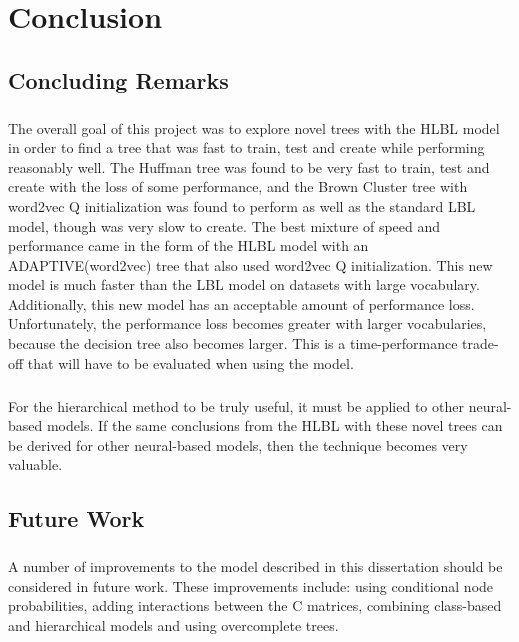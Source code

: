 
\chapter{Conclusion}

\section{Concluding Remarks}
\paragraph{}
The overall goal of this project was to explore novel trees with the HLBL model in order to find a tree that was fast to train, test and create while performing reasonably well. The Huffman tree was found to be very fast to train, test and create with the loss of some performance, and the Brown Cluster tree with word2vec Q initialization was found to perform as well as the standard LBL model, though was very slow to create. The best mixture of speed and performance came in the form of the HLBL model with an ADAPTIVE(word2vec) tree that also used word2vec Q initialization. This new model is much faster than the LBL model on datasets with large vocabulary. Additionally, this new model has an acceptable amount of performance loss. Unfortunately, the performance loss becomes greater with larger vocabularies, because the decision tree also  becomes larger. This is a time-performance trade-off that will have to be evaluated when using the model.
\paragraph{}
For the hierarchical method to be truly useful, it must be applied to other neural-based models. If the same conclusions from the HLBL with these novel trees can be derived for other neural-based models, then the technique becomes very valuable.

\section{Future Work}
\paragraph{}
A number of improvements to the model described in this dissertation should be considered in future work.
These improvements include: using conditional node probabilities, adding interactions between the C matrices, combining class-based and hierarchical models and using overcomplete trees.
 
